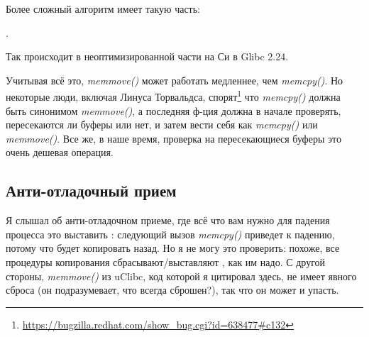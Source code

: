 Более сложный алгоритм имеет такую часть:

.

Так происходит в неоптимизированной части на Си в Glibc 2.24.

Учитывая всё это, \emph{memmove()} может работать медленнее, чем \emph{memcpy()}.
Но некоторые люди, включая Линуса Торвальдса, спорят\footnote{\url{https://bugzilla.redhat.com/show_bug.cgi?id=638477\#c132}}
что \emph{memcpy()} должна быть синонимом \emph{memmove()}, а последняя ф-ция должна в начале проверять,
пересекаются ли буферы или нет, и затем вести себя как \emph{memcpy()} или \emph{memmove()}.
Все же, в наше время, проверка на пересекающиеся буферы это очень дешевая операция.

\subsection{Анти-отладочный прием}

Я слышал об анти-отладочном приеме, где всё что вам нужно для падения процесса это выставить : следующий вызов
\emph{memcpy()} приведет к падению, потому что будет копировать назад.
Но я не могу это проверить: похоже, все процедуры копирования сбрасывают/выставляют , как им надо.
С другой стороны, \emph{memmove()} из uClibc, код которой я цитировал здесь,
не имеет явного сброса  (он подразумевает, что  всегда сброшен?),
так что он может и упасть.

